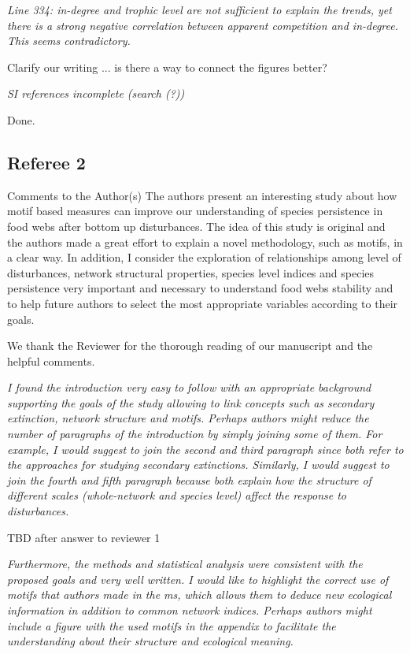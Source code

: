 \documentclass[12pt]{article}
\newcommand{\us}{\rm \setlength{\leftskip}{0.3cm} \setlength{\rightskip}{0.3cm}}
\newcommand{\them}{\it \setlength{\leftskip}{0cm} \setlength{\rightskip}{0cm}}
\begin{document}
\them
Line 334: in-degree and trophic level are not sufficient to explain the trends, yet there is a strong negative correlation between apparent competition and in-degree. This seems contradictory.

\us Clarify our writing ... is there a way to connect the figures better?

\them
SI references incomplete (search (?))

\us
Done.

\subsection*{Referee 2}


Comments to the Author(s)
The authors present an interesting study about how motif based measures can improve our understanding of species persistence in food webs after bottom up disturbances. The idea of this study is original and the authors made a great effort to explain a novel methodology, such as motifs, in a clear way. In addition, I consider the exploration of relationships among level of disturbances, network structural properties, species level indices and species persistence very important and necessary to understand food webs stability and to help future authors to select the most appropriate variables according to their goals.

\us
We thank the Reviewer for the thorough reading of our manuscript and the helpful comments. 

\them
I found the introduction very easy to follow with an appropriate background supporting the goals of the study allowing to link concepts such as secondary extinction, network structure and motifs. Perhaps authors might reduce the number of paragraphs of the introduction by simply joining some of them. For example, I would suggest to join the second and third paragraph since both refer to the approaches for studying secondary extinctions. Similarly, I would suggest to join the fourth and fifth paragraph because both explain how the structure of different scales (whole-network and species level) affect the response to disturbances.

\us TBD after answer to reviewer 1

\them
Furthermore, the methods and statistical analysis were consistent with the proposed goals and very well written. I would like to highlight the correct use of motifs that authors made in the ms, which allows them to deduce new ecological information in addition to common network indices. Perhaps authors might include a figure with the used motifs in the appendix to facilitate the understanding about their structure and ecological meaning. 
\end{document}
